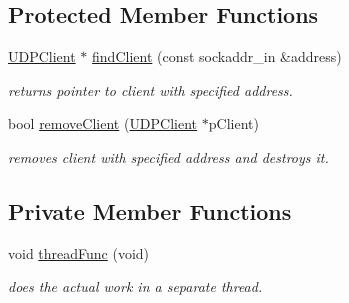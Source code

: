 \subsection*{Protected Member Functions}
\begin{DoxyCompactItemize}
\item 
\hyperlink{classTBT_1_1UDPClient}{U\+D\+P\+Client} $\ast$ \hyperlink{classTBT_1_1UDPClientInterface_aea926878d35ed4b37143e320143a84df_aea926878d35ed4b37143e320143a84df}{find\+Client} (const sockaddr\+\_\+in \&address)
\begin{DoxyCompactList}\small\item\em returns pointer to client with specified address. \end{DoxyCompactList}\item 
bool \hyperlink{classTBT_1_1UDPClientInterface_a1a80ed1e5670443bc35691c9f3d5ff72_a1a80ed1e5670443bc35691c9f3d5ff72}{remove\+Client} (\hyperlink{classTBT_1_1UDPClient}{U\+D\+P\+Client} $\ast$p\+Client)
\begin{DoxyCompactList}\small\item\em removes client with specified address and destroys it. \end{DoxyCompactList}\end{DoxyCompactItemize}
\subsection*{Private Member Functions}
\textbf{ }\par
\begin{DoxyCompactItemize}
\item 
void \hyperlink{classTBT_1_1UDPClientInterface_abce6a58e1d8fbb71f9b08e4d5b3871c2_abce6a58e1d8fbb71f9b08e4d5b3871c2}{thread\+Func} (void)
\begin{DoxyCompactList}\small\item\em does the actual work in a separate thread. \end{DoxyCompactList}\end{DoxyCompactItemize}

